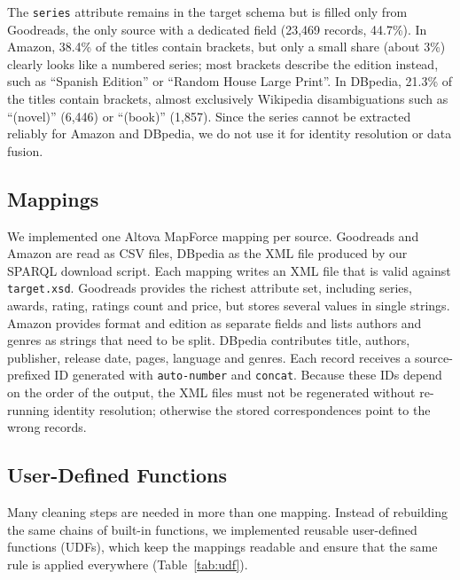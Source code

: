 \documentclass[runningheads]{llncs}
\begin{document}
The \texttt{series} attribute remains in the target schema but is filled
only from Goodreads, the only source with a dedicated field (23,469
records, 44.7\%). In Amazon, 38.4\% of the titles contain brackets, but only
a small share (about 3\%) clearly looks like a numbered series; most
brackets describe the edition instead, such as ``Spanish Edition'' or
``Random House Large Print''. In DBpedia, 21.3\% of the titles contain
brackets, almost exclusively Wikipedia disambiguations such as ``(novel)''
(6,446) or ``(book)'' (1,857). Since the series cannot be extracted
reliably for Amazon and DBpedia, we do not use it for identity resolution
or data fusion.

\subsection{Mappings}
We implemented one Altova MapForce mapping per source. Goodreads and Amazon
are read as CSV files, DBpedia as the XML file produced by our SPARQL download
script. Each mapping writes an XML file that is valid against
\texttt{target.xsd}. Goodreads provides the richest attribute set, including
series, awards, rating, ratings count and price, but stores several values in
single strings. Amazon provides format and edition as separate fields and
lists authors and genres as strings that need to be split. DBpedia
contributes title, authors, publisher, release date, pages, language and
genres. Each record receives a source-prefixed ID generated with
\texttt{auto-number} and \texttt{concat}. Because these IDs depend on the
order of the output, the XML files must not be regenerated without re-running
identity resolution; otherwise the stored correspondences point to the wrong
records.

\subsection{User-Defined Functions}
Many cleaning steps are needed in more than one mapping. Instead of rebuilding
the same chains of built-in functions, we implemented reusable user-defined
functions (UDFs), which keep the mappings readable and ensure that the same
rule is applied everywhere (Table~\ref{tab:udf}).
\end{document}

